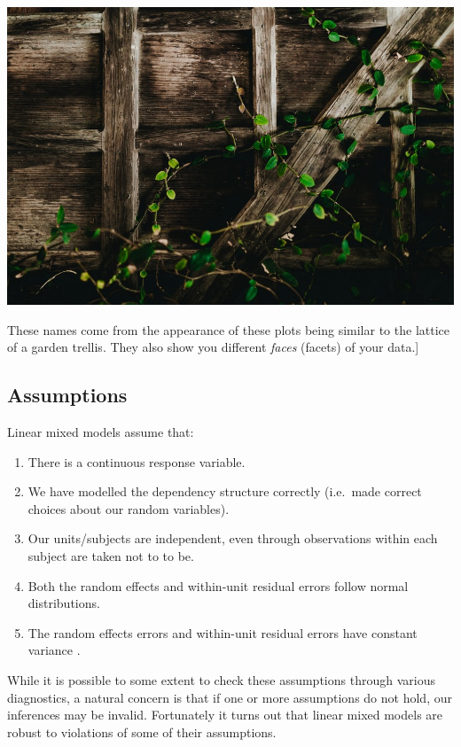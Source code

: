 \documentclass[
  openany]{book}
\providecommand{\tightlist}{%
  \setlength{\itemsep}{0pt}\setlength{\parskip}{0pt}}
\begin{document}
\begin{center}\includegraphics[width=1\linewidth]{images/m3/trellis} \end{center}

These names come from the appearance of these plots being similar to the lattice of a garden trellis. They also show you different \emph{faces} (facets) of your data.{]}

\hypertarget{assumptions-3}{%
\subsection{Assumptions}\label{assumptions-3}}

Linear mixed models assume that:

\begin{enumerate}
\def\labelenumi{\arabic{enumi}.}
\tightlist
\item
  There is a continuous response variable.
\item
  We have modelled the dependency structure correctly (i.e.~made correct choices about our random variables).
\item
  Our units/subjects are independent, even through observations within each subject are taken not to to be.
\item
  Both the random effects and within-unit residual errors follow normal distributions.
\item
  The random effects errors and within-unit residual errors have constant variance .
\end{enumerate}

While it is possible to some extent to check these assumptions through various diagnostics, a natural concern is that if one or more assumptions do not hold, our inferences may be invalid. Fortunately it turns out that linear mixed models are robust to violations of some of their assumptions.
\end{document}
